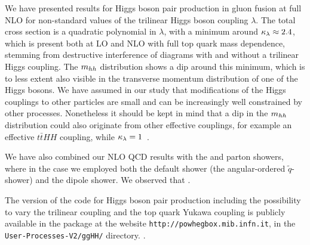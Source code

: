 We have presented results for Higgs boson pair production in gluon
fusion at full NLO for non-standard values of the trilinear Higgs
boson coupling $\lambda$. The total cross section is a quadratic
polynomial in $\lambda$, with a minimum around $\kappa_{\lambda}\approx 2.4$,
which is present both at LO and NLO with full top quark mass
dependence, stemming from destructive interference of diagrams with
and without a trilinear Higgs coupling. 
The $m_{hh}$ distribution shows a dip around this minimum, which is to
less extent also visible in the transverse momentum distribution of
one of the Higgs bosons. 
We have assumed in our study that modifications of the Higgs couplings
to other particles are small and can be increasingly well constrained by
other processes. Nonetheless it should be kept in mind that a dip in
the $m_{hh}$ distribution could also originate from other effective
couplings, for example an effective $t\bar{t}HH$ coupling, while
$\kappa_{\lambda}= 1$~\cite{Buchalla:2018yce}.

We have also combined our NLO QCD results with the \pythia and \herwig
parton showers, where in the \herwig case we employed both the default shower (the angular-ordered $\tilde{q}$-shower) and the dipole shower.
We observed that .

The \powheg{} version of the code for Higgs boson pair production
including the possibility to vary the trilinear coupling 
and the top quark Yukawa coupling 
is publicly available in the  package at the website
{\tt http://powhegbox.mib.infn.it}, in the
{\tt User-Processes-V2/ggHH/} directory.
.
